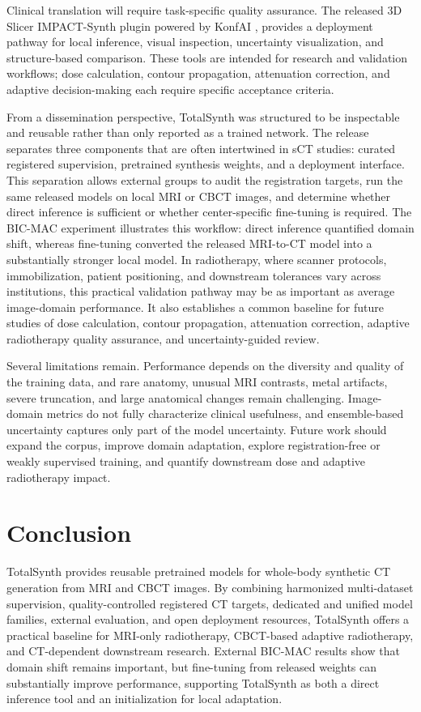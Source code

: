 \documentclass{article}
\begin{document}
Clinical translation will require task-specific quality assurance. The released 3D Slicer IMPACT-Synth plugin powered by KonfAI \cite{boussot2025konfai}, provides a deployment pathway for local inference, visual inspection, uncertainty visualization, and structure-based comparison. These tools are intended for research and validation workflows; dose calculation, contour propagation, attenuation correction, and adaptive decision-making each require specific acceptance criteria.

From a dissemination perspective, TotalSynth was structured to be inspectable and reusable rather than only reported as a trained network. The release separates three components that are often intertwined in sCT studies: curated registered supervision, pretrained synthesis weights, and a deployment interface. This separation allows external groups to audit the registration targets, run the same released models on local MRI or CBCT images, and determine whether direct inference is sufficient or whether center-specific fine-tuning is required. The BIC-MAC experiment illustrates this workflow: direct inference quantified domain shift, whereas fine-tuning converted the released MRI-to-CT model into a substantially stronger local model. In radiotherapy, where scanner protocols, immobilization, patient positioning, and downstream tolerances vary across institutions, this practical validation pathway may be as important as average image-domain performance. It also establishes a common baseline for future studies of dose calculation, contour propagation, attenuation correction, adaptive radiotherapy quality assurance, and uncertainty-guided review.

Several limitations remain. Performance depends on the diversity and quality of the training data, and rare anatomy, unusual MRI contrasts, metal artifacts, severe truncation, and large anatomical changes remain challenging. Image-domain metrics do not fully characterize clinical usefulness, and ensemble-based uncertainty captures only part of the model uncertainty. Future work should expand the corpus, improve domain adaptation, explore registration-free or weakly supervised training, and quantify downstream dose and adaptive radiotherapy impact.

\section{Conclusion}

TotalSynth provides reusable pretrained models for whole-body synthetic CT generation from MRI and CBCT images. By combining harmonized multi-dataset supervision, quality-controlled registered CT targets, dedicated and unified model families, external evaluation, and open deployment resources, TotalSynth offers a practical baseline for MRI-only radiotherapy, CBCT-based adaptive radiotherapy, and CT-dependent downstream research. External BIC-MAC results show that domain shift remains important, but fine-tuning from released weights can substantially improve performance, supporting TotalSynth as both a direct inference tool and an initialization for local adaptation.
\end{document}
